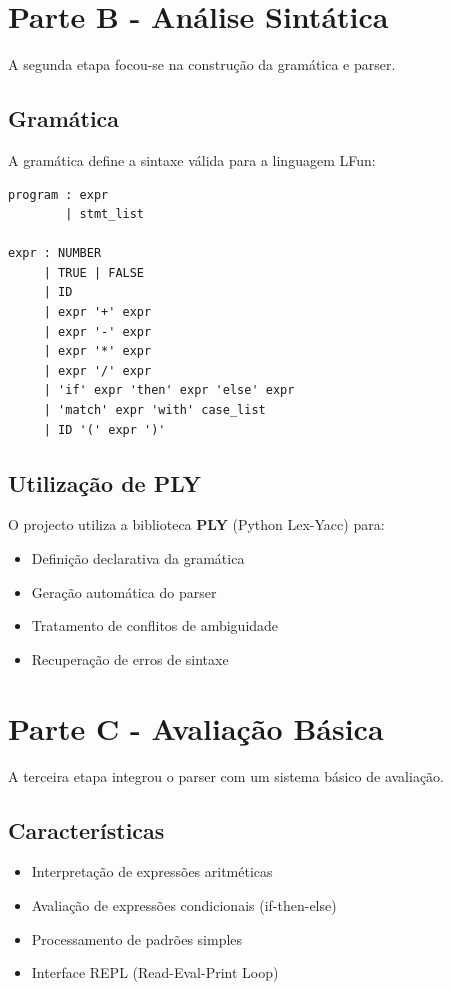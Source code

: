 \documentclass[11pt,a4paper]{report}
\begin{document}
\vspace{250}
\section{Parte B - Análise Sintática}

A segunda etapa focou-se na construção da gramática e parser.

\subsection{Gramática}

A gramática define a sintaxe válida para a linguagem LFun:

\begin{lstlisting}
program : expr
        | stmt_list

expr : NUMBER
     | TRUE | FALSE
     | ID
     | expr '+' expr
     | expr '-' expr
     | expr '*' expr
     | expr '/' expr
     | 'if' expr 'then' expr 'else' expr
     | 'match' expr 'with' case_list
     | ID '(' expr ')'
\end{lstlisting}

\subsection{Utilização de PLY}

O projecto utiliza a biblioteca \textbf{PLY} (Python Lex-Yacc) para:
\begin{itemize}
    \item Definição declarativa da gramática
    \item Geração automática do parser
    \item Tratamento de conflitos de ambiguidade
    \item Recuperação de erros de sintaxe
\end{itemize}
\vspace{270}
\section{Parte C - Avaliação Básica}

A terceira etapa integrou o parser com um sistema básico de avaliação.

\subsection{Características}

\begin{itemize}
    \item Interpretação de expressões aritméticas
    \item Avaliação de expressões condicionais (if-then-else)
    \item Processamento de padrões simples
    \item Interface REPL (Read-Eval-Print Loop)
\end{itemize}
\end{document}

